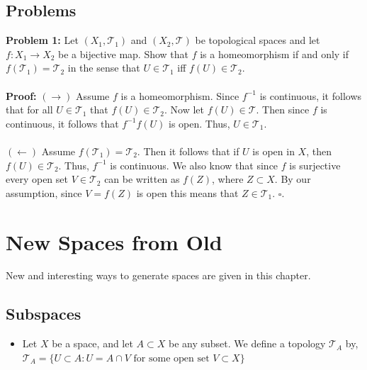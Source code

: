 \documentclass{article}
\begin{document}
\subsection{Problems}
\textbf{Problem 1:} Let $(X_1, \mathcal{T}_1)$ and $(X_2,\mathcal{T})$ be topological spaces and let $f:X_1\to X_2$ be a bijective map. Show that $f$ is a homeomorphism if and only if $f(\mathcal{T}_1)=\mathcal{T}_2$ in the sense that $U\in\mathcal{T}_1$ iff $f(U)\in \mathcal{T}_2$.\\
\\
\textbf{Proof:} $(\to)$ Assume $f$ is a homeomorphism. Since $f^{-1}$ is continuous, it follows that for all $U\in\mathcal{T}_1$ that $f(U)\in \mathcal{T}_2$. Now let $f(U)\in\mathcal{T}$. Then since $f$ is continuous, it follows that $f^{-1}f(U)$ is open. Thus, $U\in \mathcal{T}_1$.\\
\\
$(\leftarrow)$ Assume $f(\mathcal{T}_1 ) = \mathcal{T}_2$. Then it follows that if $U$ is open in $X$, then $f(U)\in\mathcal{T}_2$. Thus, $f^{-1}$ is continuous. We also know that since $f$ is surjective every open set $V\in \mathcal{T}_2$ can be written as $f(Z)$, where $Z\subset X$. By our assumption, since $V=f(Z)$ is open this means that $Z\in\mathcal{T}_1$. $\square$.
\section{New Spaces from Old}
New and interesting ways to generate spaces are given in this chapter.
\subsection{Subspaces}
\begin{itemize}
    \item Let $X$ be a space, and let $A\subset X$ be any subset. We define a topology $\mathcal{T}_A$ by,\\
    $\mathcal{T}_A=\{U\subset A:U=A\cap V \text{ for some open set } V\subset X\}$
\end{itemize}
\end{document}
